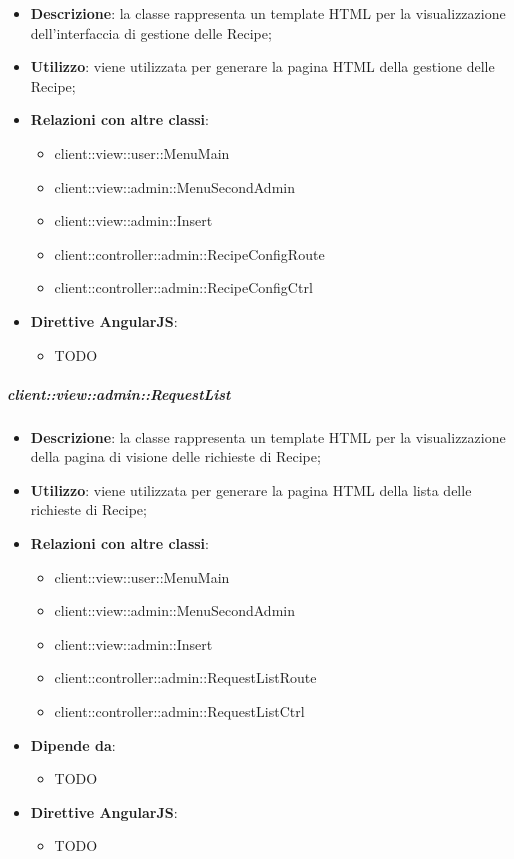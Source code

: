 			\begin{itemize}
				\item \textbf{Descrizione}: la classe rappresenta un template HTML per la visualizzazione dell'interfaccia di gestione delle Recipe;
				\item \textbf{Utilizzo}: viene utilizzata per generare la pagina HTML della gestione delle Recipe;
				\item \textbf{Relazioni con altre classi}:
					\begin{itemize}
						\item client::view::user::MenuMain
						\item client::view::admin::MenuSecondAdmin
						\item client::view::admin::Insert
						\item client::controller::admin::RecipeConfigRoute
						\item client::controller::admin::RecipeConfigCtrl
					\end{itemize}
				\item \textbf{Direttive AngularJS}:
					\begin{itemize}
						\item TODO
					\end{itemize}
			\end{itemize}

		\subparagraph{client::view::admin::RequestList} %
		\label{subp:bdsm_app_client_view_admin_requestlist}

			\begin{itemize}
				\item \textbf{Descrizione}: la classe rappresenta un template HTML per la visualizzazione della pagina di visione delle richieste di Recipe;
				\item \textbf{Utilizzo}: viene utilizzata per generare la pagina HTML della lista delle richieste di Recipe;
				\item \textbf{Relazioni con altre classi}:
					\begin{itemize}
						\item client::view::user::MenuMain
						\item client::view::admin::MenuSecondAdmin
						\item client::view::admin::Insert
						\item client::controller::admin::RequestListRoute
						\item client::controller::admin::RequestListCtrl
					\end{itemize}
				\item \textbf{Dipende da}:
					\begin{itemize}
						\item TODO
					\end{itemize}
				\item \textbf{Direttive AngularJS}:
					\begin{itemize}
						\item TODO
					\end{itemize}
			\end{itemize}


